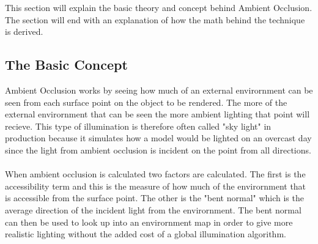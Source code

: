 This section will explain the basic theory and concept behind Ambient Occlusion. The section will end with an explanation of how the math behind the technique is derived.

\subsection{The Basic Concept}
Ambient Occlusion works by seeing how much of an external envirornment can be seen from each surface point on the object to be rendered. The more of the external envirornment that can be seen the more ambient lighting that point will recieve. This type of illumination is therefore often called "sky light" in production because it simulates how a model would be lighted on an overcast day since the light from ambient occlusion is incident on the point from all directions.
\\ \\
When ambient occlusion is calculated two factors are calculated. The first is the accessibility term and this is the measure of how much of the envirornment that is accessible from the surface point. The other is the "bent normal" which is the average direction of the incident light from the envirornment. The bent normal can then be used to look up into an envirornment map in order to give more realistic lighting without the added cost of a global illumination algorithm.
